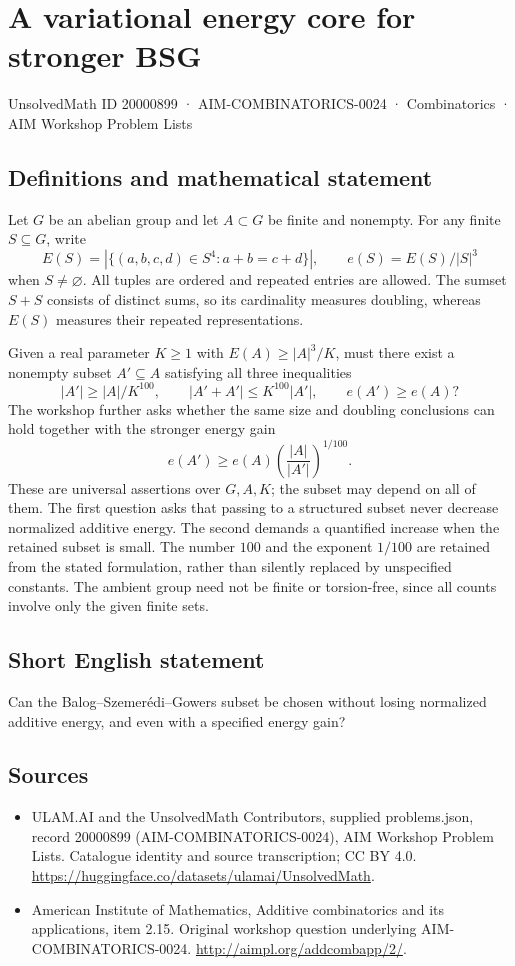\documentclass[11pt,a4paper]{article}
\begin{document}
\section*{A variational energy core for stronger BSG}\label{20000899}
{\small UnsolvedMath ID 20000899 · AIM-COMBINATORICS-0024 · Combinatorics · AIM Workshop Problem Lists}
\subsection{Definitions and mathematical statement}
Let $G$ be an abelian group and let $A\subset G$ be finite and nonempty.
For any finite $S\subseteq G$, write
\[
 E(S)=|\{(a,b,c,d)\in S^4:a+b=c+d\}|,
 \qquad e(S)=E(S)/|S|^3
\]
when $S\ne\varnothing$.
All tuples are ordered and repeated entries are allowed.
The sumset $S+S$ consists of distinct sums, so its cardinality measures doubling, whereas $E(S)$ measures their repeated representations.

Given a real parameter $K\geq1$ with $E(A)\geq |A|^3/K$, must there exist a nonempty subset $A'\subseteq A$ satisfying all three inequalities
\[
 |A'|\geq |A|/K^{100},\qquad
 |A'+A'|\leq K^{100}|A'|,\qquad e(A')\geq e(A)?
\]
The workshop further asks whether the same size and doubling conclusions can hold together with the stronger energy gain
\[
 e(A')\geq e(A)\left(\frac{|A|}{|A'|}\right)^{1/100}.
\]
These are universal assertions over $G,A,K$; the subset may depend on all of them.
The first question asks that passing to a structured subset never decrease normalized additive energy.
The second demands a quantified increase when the retained subset is small.
The number $100$ and the exponent $1/100$ are retained from the stated formulation, rather than silently replaced by unspecified constants.
The ambient group need not be finite or torsion-free, since all counts involve only the given finite sets.
\subsection{Short English statement}
Can the Balog--Szemerédi--Gowers subset be chosen without losing normalized additive energy, and even with a specified energy gain?
\subsection{Sources}
\begin{itemize}
\item[S1] ULAM.AI and the UnsolvedMath Contributors, supplied problems.json, record 20000899 (AIM-COMBINATORICS-0024), AIM Workshop Problem Lists. Catalogue identity and source transcription; CC BY 4.0.
\url{https://huggingface.co/datasets/ulamai/UnsolvedMath}.
\item[S2] American Institute of Mathematics, Additive combinatorics and its applications, item 2.15. Original workshop question underlying AIM-COMBINATORICS-0024.
\url{http://aimpl.org/addcombapp/2/}.
\end{itemize}
\end{document}
